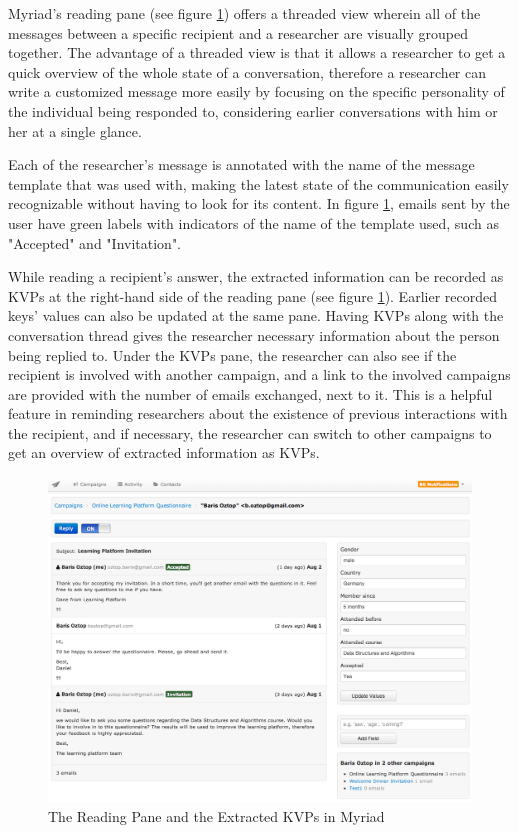 Myriad's reading pane (see figure \ref{fig:MyriadReadingPane}) offers a threaded view wherein all of the messages between a specific recipient and a researcher are visually grouped together. The advantage of a threaded view is that it allows a researcher to get a quick overview of the whole state of a conversation, therefore a researcher can write a customized message more easily by focusing on the specific personality of the individual being responded to, considering earlier conversations with him or her at a single glance.
\vspace{1cm}

Each of the researcher's message is annotated with the name of the message template that was used with, making the latest state of the communication easily recognizable without having to look for its content. In figure \ref{fig:MyriadReadingPane}, emails sent by the user have green labels with indicators of the name of the template used, such as "Accepted" and "Invitation".
\vspace{1cm}

While reading a recipient's answer, the extracted information can be recorded as \ac{KVP}s at the right-hand side of the reading pane (see figure \ref{fig:MyriadReadingPane}). Earlier recorded keys' values can also be updated at the same pane. Having \ac{KVP}s along with the conversation thread gives the researcher necessary information about the person being replied to. Under the \ac{KVP}s pane, the researcher can also see if the recipient is involved with another campaign, and a link to the involved campaigns are provided with the number of emails exchanged, next to it. This is a helpful feature in reminding researchers about the existence of previous interactions with the recipient, and if necessary, the researcher can switch to other campaigns to get an overview of extracted information as \ac{KVP}s.
\vspace{1cm}

\begin{figure}[htbp]
	\centering
	\includegraphics[width=1.00\textwidth]{imgs/MyriadReadingPane.png}
	\caption[The Reading Pane and the Extracted \ac{KVP}s in Myriad]{The Reading Pane and the Extracted \ac{KVP}s in Myriad}
	\label{fig:MyriadReadingPane}
\end{figure}

